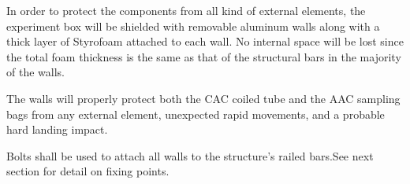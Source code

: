 In order to protect the components from all kind of external elements, the experiment box will be shielded with removable aluminum walls along with a thick layer of Styrofoam attached to each wall. No internal space will be lost since the total foam thickness is the same as that of the structural bars in the majority of the walls. 


The walls will properly protect both the CAC coiled tube and the AAC sampling bags from any external element, unexpected rapid movements, and a probable hard landing impact. %


Bolts shall be used to attach all walls to the structure's railed bars.See next section for detail on fixing points.



\raggedbottom